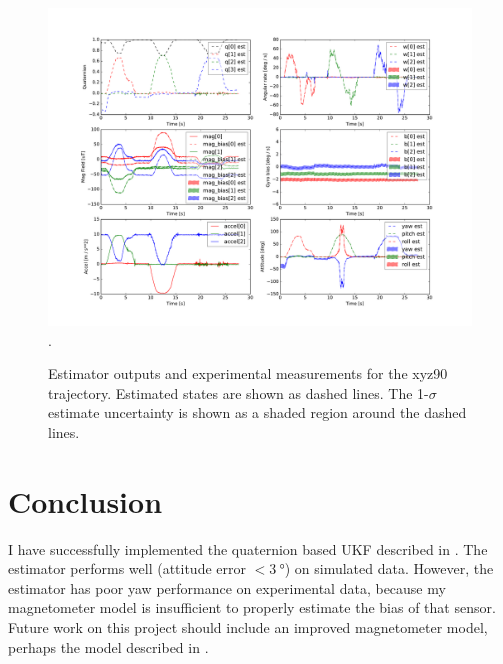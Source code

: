 \documentclass[conference]{IEEEtran}
\begin{document}
\begin{figure}[!t]
  \centering
  \includegraphics[width=8in]{figures/est_result_pickle_xyz90.pdf}
  \DeclareGraphicsExtensions.
  \caption{Estimator outputs and experimental measurements for the xyz90 trajectory. Estimated states are shown as dashed lines. The 1-$\sigma$ estimate uncertainty is shown as a shaded region around the dashed lines.}
  \label{fig:est_result_pickle_xyz90}
\end{figure}


\section{Conclusion}
I have successfully implemented the quaternion based UKF described in \cite{1257247}. The estimator performs well (attitude error $< \SI{3}{\degree}$) on simulated data. However, the estimator has poor yaw performance on experimental data, because my magnetometer model is insufficient to properly estimate the bias of that sensor. Future work on this project should include an improved magnetometer model, perhaps the model described in \cite{Crassidis2005}.




\newpage
{}






\end{document}
